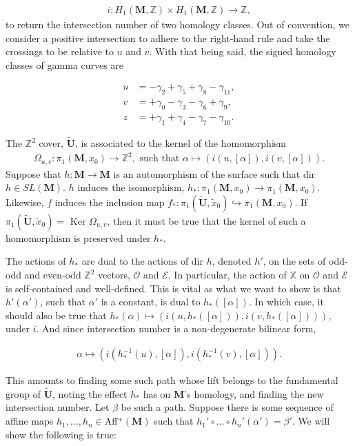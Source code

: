 \documentclass[]{article}
\begin{document}
\begin{align}
i:H_1(\mathbf{M},\mathbb Z)\times H_1(\mathbf{M},\mathbb Z)\rightarrow \mathbb Z,
\end{align}
to return the intersection number of two homology classes. Out of convention, we consider a positive intersection to adhere to the right-hand rule and take the crossings to be relative to $u$ and $v$. With that being said, the signed homology classes of gamma curves are

\begin{align*}
u &= -\gamma_2 +\gamma_5 + \gamma_8 - \gamma_{11},\\
v &= +\gamma_0 -\gamma_3 -\gamma_6 +\gamma_9,\\
z &= +\gamma_1 +\gamma_4-\gamma_7-\gamma_{10}.
\end{align*}


The $\mathbb{Z}^2$ cover, $\tilde{\mathbf{U}}$, is associated to the kernel of the homomorphism
\begin{align}
\Omega_{u,v}:\pi_1(\mathbf{M},x_0)\rightarrow \mathbb{Z}^2, \text{ such that } \alpha\mapsto(i(u,[\alpha]),i(v,[\alpha])).
\end{align}
Suppose that $h:\mathbf{M}\rightarrow\mathbf{M}$ is an automorphism of the surface such that dir $h\in SL(\mathbf M)$. $h$ induces the isomorphism, $h_*:\pi_1(\mathbf{M},x_0)\rightarrow \pi_1(\mathbf{M},x_0)$. Likewise, $f$ induces the inclusion map $f_*:\pi_1(\tilde{\mathbf{U}},\tilde x_0)\hookrightarrow\pi_1(\mathbf{M},x_0)$. If $\pi_1(\tilde{\mathbf{U}},\tilde x_0) = $ Ker $\Omega_{u,v}$, then it must be true that the kernel of such a homomorphism is preserved under $h_*$. 

The actions of $h_*$ are dual to the actions of dir $h$, denoted $h'$, on the sets of odd-odd and even-odd $\mathbb{Z}^2$ vectors, $\mathcal{O}$ and $\mathcal{E}$. In particular, the action of $\mathbb X$ on $\mathcal{O}$ and $\mathcal{E}$ is self-contained and well-defined. This is vital as what we want to show is that $h'(\alpha')$, such that $\alpha'$ is a constant, is dual to $h_*([\alpha])$. In which case, it should also be true that $h_*(\alpha)\mapsto(i(u,h_*([\alpha])),i(v,h_*([\alpha])))$, under $i$. And since intersection number is a non-degenerate bilinear form, 

\begin{align*}
\alpha\mapsto(i(h_*^{-1}(u),[\alpha]),i(h_*^{-1}(v),[\alpha])).
\end{align*}

This amounts to finding some such path whose lift belongs to the fundamental group of $\tilde{\mathbf U}$, noting the effect $h_*$ has on $\mathbf M$'s homology, and finding the new intersection number. Let $\beta$ be such a path. Suppose there is some sequence of affine maps $h_1,...,h_n\in$Aff$^+(\mathbf{M})$ such that $h_1' \circ ... \circ h_n'(\alpha')=\beta'$. We will show the following is true:
\end{document}

